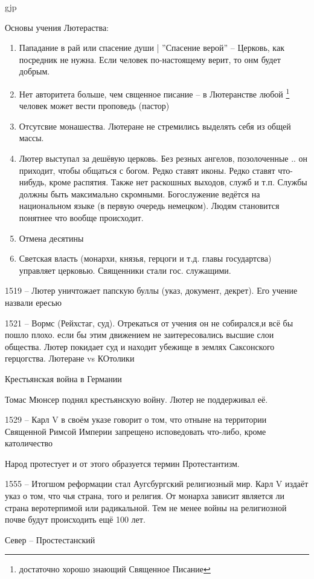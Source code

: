 gjp	 \documentclass[12pt,a4paper]{article}
\begin{document}
Основы учения Лютераства:
\begin{enumerate}
	\item Пападание в рай или спасение души | ''Спасение верой'' -- Церковь, как посредник не нужна. Если человек по-настоящему верит, то онм будет добрым.
	\item Нет авторитета больше, чем свщенное писание -- в Лютеранстве любой \footnote{достаточно хорошо знающий Священное Писание} человек может вести проповедь (пастор)
	\item Отсутсвие монашества. Лютеране не стремились выделять себя из общей массы.
	\item Лютер выступал за дешёвую церковь. Без резных ангелов, позолоченные .. он приходит, чтобы общаться с богом. Редко ставят иконы. Редко ставят что-нибудь, кроме распятия. Также нет раскошных выходов, служб и т.п. Службы должны быть максимально скромными. Богослужение ведётся на национальном языке (в первую очередь немецком). Людям становится понятнее что вообще происходит.
	\item Отмена десятины
	\item Светская власть (монархи, князья, герцоги и т.д. главы государтсва) управляет церковью. Священники стали гос. служащими.
\end{enumerate}

1519 -- Лютер уничтожает папскую буллы (указ, документ, декрет). Его учение назвали ересью

1521 -- Вормс (Рейхстаг, суд). Отрекаться от учения он не собирался,и всё бы пошло плохо. если бы этим движением не заитересовались высшие слои общества. Лютер покидает суд и находит убежище в землях Саксонского герцогства. Лютеране vs КОтолики

Крестьянская война в Германии

Томас Мюнсер поднял крестьянскую войну. Лютер не поддерживал её.

1529 -- Карл V  в своём указе говорит о том, что отныне на территории Священной Римсой Империи запрещено исповедовать что-либо, кроме католичество

Народ протестует и от этого образуется термин Протестантизм.

1555 -- Итогшом реформации стал Аугсбургский религиозный мир. Карл V издаёт указ о том, что чья страна, того и религия. От монарха зависит является ли страна веротерпимой или радикальной. Тем не менее войны на религиозной почве будут происходить ещё 100 лет. 

Север -- Простестанский
\end{document}
